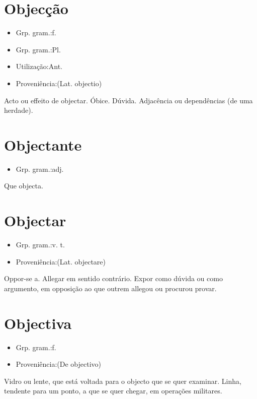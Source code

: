 \section{Objecção}
\begin{itemize}
\item {Grp. gram.:f.}
\end{itemize}
\begin{itemize}
\item {Grp. gram.:Pl.}
\end{itemize}
\begin{itemize}
\item {Utilização:Ant.}
\end{itemize}
\begin{itemize}
\item {Proveniência:(Lat. \textunderscore objectio\textunderscore )}
\end{itemize}
Acto ou effeito de objectar.
Óbice.
Dúvida.
Adjacência ou dependências (de uma herdade).
\section{Objectante}
\begin{itemize}
\item {Grp. gram.:adj.}
\end{itemize}
Que objecta.
\section{Objectar}
\begin{itemize}
\item {Grp. gram.:v. t.}
\end{itemize}
\begin{itemize}
\item {Proveniência:(Lat. \textunderscore objectare\textunderscore )}
\end{itemize}
Oppor-se a.
Allegar em sentido contrário.
Expor como dúvida ou como argumento, em opposição ao que outrem allegou ou procurou provar.
\section{Objectiva}
\begin{itemize}
\item {Grp. gram.:f.}
\end{itemize}
\begin{itemize}
\item {Proveniência:(De \textunderscore objectivo\textunderscore )}
\end{itemize}
Vidro ou lente, que está voltada para o objecto que se quer examinar.
Linha, tendente para um ponto, a que se quer chegar, em operações militares.

